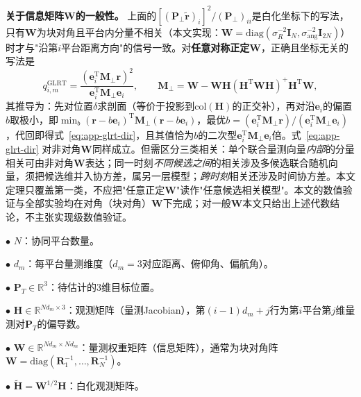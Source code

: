 \documentclass[UTF8,a4paper,zihao=-4]{ctexart}
\begin{document}
\noindent\textbf{关于信息矩阵\(\mathbf{W}\)的一般性。} 上面的\([(\mathbf{P}_{\perp}\widetilde{\mathbf{r}})_i]^2/(\mathbf{P}_{\perp})_{ii}\)是白化坐标下的写法，只有\(\mathbf{W}\)为块对角且平台内分量不相关（本文实现：\(\mathbf{W}=\mathrm{diag}(\sigma_R^{-2}\boldsymbol I_N,\sigma_{\mathrm{ang}}^{-2}\boldsymbol I_{2N})\)）时才与"沿第\(i\)平台距离方向"的信号一致。对\textbf{任意对称正定}\(\mathbf{W}\)，正确且坐标无关的写法是
\begin{equation}
q^{\mathrm{GLRT}}_{i,m}=\frac{(\mathbf{e}_i^{\mathrm T}\boldsymbol M_{\perp}\mathbf{r})^2}{\mathbf{e}_i^{\mathrm T}\boldsymbol M_{\perp}\mathbf{e}_i},
\qquad
\boldsymbol M_{\perp}=\mathbf{W}-\mathbf{W}\mathbf{H}(\mathbf{H}^{\mathrm T}\mathbf{W}\mathbf{H})^{+}\mathbf{H}^{\mathrm T}\mathbf{W},
\label{eq:app-glrt-dir}
\end{equation}
其推导为：先对位置\(\delta\)求剖面（等价于投影到\(\mathrm{col}(\mathbf{H})\)的正交补），再对沿\(\mathbf{e}_i\)的偏置\(b\)取极小，即\(\min_b (\mathbf{r}-b\mathbf{e}_i)^{\mathrm T}\boldsymbol M_{\perp}(\mathbf{r}-b\mathbf{e}_i)\)，最优\(b=(\mathbf{e}_i^{\mathrm T}\boldsymbol M_{\perp}\mathbf{r})/(\mathbf{e}_i^{\mathrm T}\boldsymbol M_{\perp}\mathbf{e}_i)\)，代回即得式~\eqref{eq:app-glrt-dir}，且其值恰为\(b\)的二次型\(\mathbf{e}_i^{\mathrm T}\boldsymbol M_{\perp}\mathbf{e}_i\)倍。式~\eqref{eq:app-glrt-dir} 对非对角\(\mathbf{W}\)同样成立。但需区分三类相关：单个联合量测向量\emph{内部}的分量相关可由非对角\(\mathbf{W}\)表达；同一时刻\emph{不同候选之间}的相关涉及多候选联合随机向量，须把候选维并入协方差，属另一层模型；\emph{跨时刻}相关还涉及时间协方差。本文定理只覆盖第一类，不应把"任意正定\(\mathbf{W}\)"读作"任意候选相关模型"。本文的数值验证与全部实验均在对角（块对角）\(\mathbf{W}\)下完成；对一般\(\mathbf{W}\)本文只给出上述代数结论，不主张实现级数值验证。

\(\bullet\) \(N\)：协同平台数量。

\(\bullet\) \(d_m\)：每平台量测维度（\(d_m=3\)对应距离、俯仰角、偏航角）。

\(\bullet\) \(\mathbf{P}_T\in\mathbb{R}^3\)：待估计的3维目标位置。

\(\bullet\) \(\mathbf{H}\in\mathbb{R}^{Nd_m\times 3}\)：观测矩阵（量测Jacobian），第\((i-1)d_m+j\)行为第\(i\)平台第\(j\)维量测对\(\mathbf{P}_T\)的偏导数。

\(\bullet\) \(\mathbf{W}\in\mathbb{R}^{Nd_m\times Nd_m}\)：量测权重矩阵（信息矩阵），通常为块对角阵\(\mathbf{W}=\text{diag}(\mathbf{R}_1^{-1},\ldots,\mathbf{R}_N^{-1})\)。

\(\bullet\) \(\widetilde{\mathbf{H}}=\mathbf{W}^{1/2}\mathbf{H}\)：白化观测矩阵。
\end{document}
